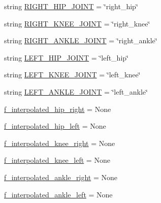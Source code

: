 \begin{DoxyCompactItemize}
\item 
string \mbox{\hyperlink{namespacejoint__angle__velocity__factor__test_ac7b36929206f6eb92083e549c489c592}{R\+I\+G\+H\+T\+\_\+\+H\+I\+P\+\_\+\+J\+O\+I\+NT}} = \char`\"{}right\+\_\+hip\char`\"{}
\item 
string \mbox{\hyperlink{namespacejoint__angle__velocity__factor__test_ae60c63556ebf0b8d24fa149a72f2871e}{R\+I\+G\+H\+T\+\_\+\+K\+N\+E\+E\+\_\+\+J\+O\+I\+NT}} = \char`\"{}right\+\_\+knee\char`\"{}
\item 
string \mbox{\hyperlink{namespacejoint__angle__velocity__factor__test_a65e3e8dec789bfca51775ee1a38f36ca}{R\+I\+G\+H\+T\+\_\+\+A\+N\+K\+L\+E\+\_\+\+J\+O\+I\+NT}} = \char`\"{}right\+\_\+ankle\char`\"{}
\item 
string \mbox{\hyperlink{namespacejoint__angle__velocity__factor__test_a5bd5e03d3852a1f1e0921e13a9599dda}{L\+E\+F\+T\+\_\+\+H\+I\+P\+\_\+\+J\+O\+I\+NT}} = \char`\"{}left\+\_\+hip\char`\"{}
\item 
string \mbox{\hyperlink{namespacejoint__angle__velocity__factor__test_aa2af43a5e0dc8c6501c7f8ba5f7df413}{L\+E\+F\+T\+\_\+\+K\+N\+E\+E\+\_\+\+J\+O\+I\+NT}} = \char`\"{}left\+\_\+knee\char`\"{}
\item 
string \mbox{\hyperlink{namespacejoint__angle__velocity__factor__test_ad5e75131ac31da91d5d64b3c9745fe26}{L\+E\+F\+T\+\_\+\+A\+N\+K\+L\+E\+\_\+\+J\+O\+I\+NT}} = \char`\"{}left\+\_\+ankle\char`\"{}
\item 
\mbox{\hyperlink{namespacejoint__angle__velocity__factor__test_a33c2b9d5c70a1ac63e9dc4cb76dd4794}{f\+\_\+interpolated\+\_\+hip\+\_\+right}} = None
\item 
\mbox{\hyperlink{namespacejoint__angle__velocity__factor__test_a85487d17a9904184f1886b62b03d2256}{f\+\_\+interpolated\+\_\+hip\+\_\+left}} = None
\item 
\mbox{\hyperlink{namespacejoint__angle__velocity__factor__test_a70d63fd04e034e1683aef7f89aaef108}{f\+\_\+interpolated\+\_\+knee\+\_\+right}} = None
\item 
\mbox{\hyperlink{namespacejoint__angle__velocity__factor__test_a94c51300f52354694751c2d3a6c58812}{f\+\_\+interpolated\+\_\+knee\+\_\+left}} = None
\item 
\mbox{\hyperlink{namespacejoint__angle__velocity__factor__test_adfacb5c6d4e1462c486a1b5c55c8e252}{f\+\_\+interpolated\+\_\+ankle\+\_\+right}} = None
\item 
\mbox{\hyperlink{namespacejoint__angle__velocity__factor__test_afc03d55faf184cc20d04f88a22d0fd92}{f\+\_\+interpolated\+\_\+ankle\+\_\+left}} = None

\end{DoxyCompactItemize}
